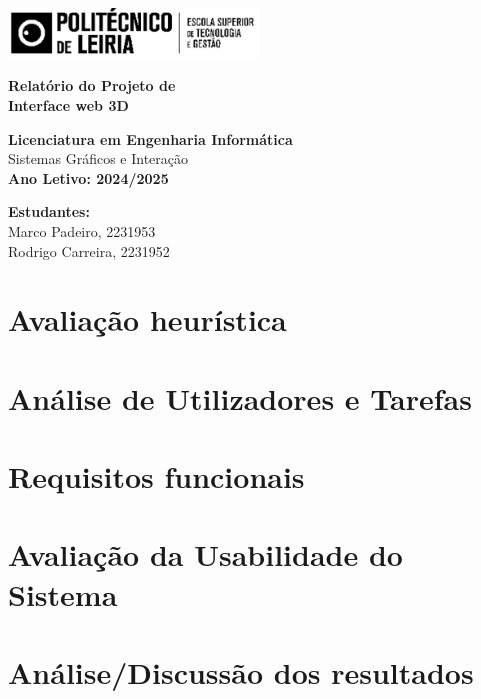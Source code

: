 \documentclass[a4paper,12pt]{article}
\begin{document}
\begin{titlepage}
\begin{center}
    \includegraphics[width=0.5\textwidth]{logo_ipl.png}
\end{center}

\vspace{1cm}

\begin{center}
    \fboxsep=10pt
    \parbox[c][3cm][c]{0.8\textwidth}{
        \centering
        \textbf{\Large Relatório do Projeto de}\\[0.3cm]
        \textbf{\Large Interface web 3D}
    }
\end{center}

\vfill

\begin{center}
    \textbf{Licenciatura em Engenharia Informática}\\
    Sistemas Gráficos e Interação\\[0.5cm]
    \vspace{1cm}
    \textbf{Ano Letivo: 2024/2025}
\end{center}

\vfill

\begin{center}
    \textbf{Estudantes:}\\[0.3cm]
    Marco Padeiro, 2231953\\
    Rodrigo Carreira, 2231952
\end{center}
\thispagestyle{plain}
\end{titlepage}

\newpage
\tableofcontents

\newpage
\section{Avaliação heurística}

\newpage
\section{Análise de Utilizadores e Tarefas}

\newpage
\section{Requisitos funcionais}

\newpage
\section{Avaliação da Usabilidade do Sistema}

\newpage
\section{Análise/Discussão dos resultados}
\end{document}
